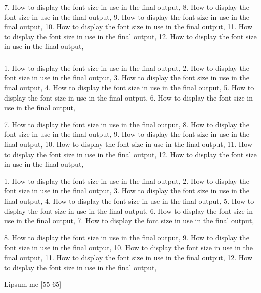7. How to display the font size in use in the final output,
8. How to display the font size in use in the final output,
9. How to display the font size in use in the final output,
10. How to display the font size in use in the final output,
11. How to display the font size in use in the final output,
12. How to display the font size in use in the final output,

\subsubsection{\showfont}

1. How to display the font size in use in the final output,
2. How to display the font size in use in the final output,
3. How to display the font size in use in the final output,
4. How to display the font size in use in the final output,
5. How to display the font size in use in the final output,
6. How to display the font size in use in the final output,

7. How to display the font size in use in the final output,
8. How to display the font size in use in the final output,
9. How to display the font size in use in the final output,
10. How to display the font size in use in the final output,
11. How to display the font size in use in the final output,
12. How to display the font size in use in the final output,

\subsubsubsection{\showfont}

1. How to display the font size in use in the final output,
2. How to display the font size in use in the final output,
3. How to display the font size in use in the final output,
4. How to display the font size in use in the final output,
5. How to display the font size in use in the final output,
6. How to display the font size in use in the final output,
7. How to display the font size in use in the final output,

8. How to display the font size in use in the final output,
9. How to display the font size in use in the final output,
10. How to display the font size in use in the final output,
11. How to display the font size in use in the final output,
12. How to display the font size in use in the final output,


Lipsum me [55-65]


